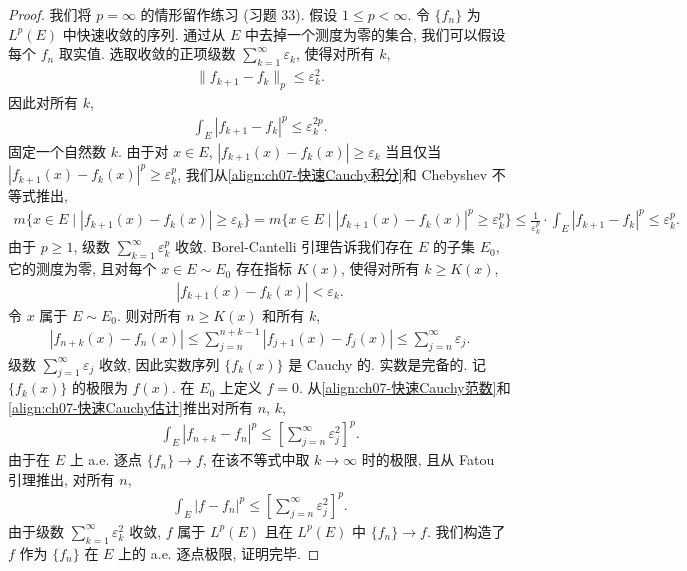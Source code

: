 \documentclass[../../main.tex]{subfiles}
\begin{document}
\begin{proof}
我们将 $p=\infty$ 的情形留作练习 (习题 33). 假设 $1\leqslant p<\infty$. 令 $\{f_{n}\}$ 为 $L^{p}(E)$ 中快速收敛的序列. 通过从 $E$ 中去掉一个测度为零的集合, 我们可以假设每个 $f_{n}$ 取实值. 选取收敛的正项级数 $\sum_{k=1}^{\infty}\varepsilon_{k}$, 使得对所有 $k$,
\begin{align}
\|f_{k+1}-f_{k}\|_{p}\leqslant\varepsilon_{k}^{2}.\label{align:ch07-快速Cauchy范数}
\end{align}
因此对所有 $k$,
\begin{align}
\int_{E}|f_{k+1}-f_{k}|^{p}\leqslant\varepsilon_{k}^{2p}.\label{align:ch07-快速Cauchy积分}
\end{align}
固定一个自然数 $k$. 由于对 $x\in E$, $|f_{k+1}(x)-f_{k}(x)|\geqslant\varepsilon_{k}$ 当且仅当 $|f_{k+1}(x)-f_{k}(x)|^{p}\geqslant\varepsilon_{k}^{p}$, 我们从\eqref{align:ch07-快速Cauchy积分}和 Chebyshev 不等式推出,
\begin{align*}
m\{x\in E\mid|f_{k+1}(x)-f_{k}(x)|\geqslant\varepsilon_{k}\}=m\{x\in E\mid|f_{k+1}(x)-f_{k}(x)|^{p}\geqslant\varepsilon_{k}^{p}\}\leqslant\frac{1}{\varepsilon_{k}^{p}}\cdot\int_{E}|f_{k+1}-f_{k}|^{p}\leqslant\varepsilon_{k}^{p}.
\end{align*}
由于 $p\geqslant 1$, 级数 $\sum_{k=1}^{\infty}\varepsilon_{k}^{p}$ 收敛. Borel-Cantelli 引理告诉我们存在 $E$ 的子集 $E_{0}$, 它的测度为零, 且对每个 $x\in E\sim E_{0}$ 存在指标 $K(x)$, 使得对所有 $k\geqslant K(x)$,
\begin{align*}
|f_{k+1}(x)-f_{k}(x)|<\varepsilon_{k}.
\end{align*}
令 $x$ 属于 $E\sim E_{0}$. 则对所有 $n\geqslant K(x)$ 和所有 $k$,
\begin{align}
|f_{n+k}(x)-f_{n}(x)|\leqslant\sum_{j=n}^{n+k-1}|f_{j+1}(x)-f_{j}(x)|\leqslant\sum_{j=n}^{\infty}\varepsilon_{j}.\label{align:ch07-逐点Cauchy}
\end{align}
级数 $\sum_{j=1}^{\infty}\varepsilon_{j}$ 收敛, 因此实数序列 $\{f_{k}(x)\}$ 是 Cauchy 的. 实数是完备的. 记 $\{f_{k}(x)\}$ 的极限为 $f(x)$. 在 $E_{0}$ 上定义 $f=0$. 从\eqref{align:ch07-快速Cauchy范数}和\eqref{align:ch07-快速Cauchy估计}推出对所有 $n$, $k$,
\begin{align}
\int_{E}|f_{n+k}-f_{n}|^{p}\leqslant\left[\sum_{j=n}^{\infty}\varepsilon_{j}^{2}\right]^{p}.\label{align:ch07-范数估计}
\end{align}
由于在 $E$ 上 a.e. 逐点 $\{f_{n}\}\to f$, 在该不等式中取 $k\to\infty$ 时的极限, 且从 Fatou 引理推出, 对所有 $n$,
\begin{align*}
\int_{E}|f-f_{n}|^{p}\leqslant\left[\sum_{j=n}^{\infty}\varepsilon_{j}^{2}\right]^{p}.
\end{align*}
由于级数 $\sum_{k=1}^{\infty}\varepsilon_{k}^{2}$ 收敛, $f$ 属于 $L^{p}(E)$ 且在 $L^{p}(E)$ 中 $\{f_{n}\}\to f$. 我们构造了 $f$ 作为 $\{f_{n}\}$ 在 $E$ 上的 a.e. 逐点极限, 证明完毕.
\end{proof}
\end{document}
